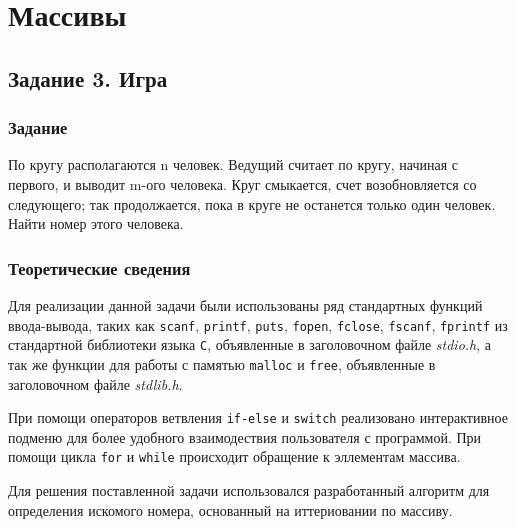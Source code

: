 \documentclass[12pt,a4paper]{report}
\begin{document}
\newpage



\chapter{Массивы}
\section{Задание 3. Игра}
\subsection{Задание}

\hspace{\parindent}По кругу располагаются n человек. Ведущий считает по кругу, начиная с первого, и выводит m-ого человека. Круг смыкается, счет возобновляется со следующего; так  продолжается, пока в круге не останется только один человек. Найти номер этого человека.

\subsection{Теоретические сведения}
\hspace{\parindent}Для реализации данной задачи были использованы ряд стандартных функций ввода-вывода, таких как \texttt{scanf}, \texttt{printf}, \texttt{puts}, \texttt{fopen}, \texttt{fclose}, \texttt{fscanf}, \texttt{fprintf} из стандартной библиотеки языка \verb+С+, объявленные в заголовочном файле \textit{stdio.h}, а так же функции для работы с памятью \verb+malloc+ и \verb+free+, объявленные в заголовочном файле \textit{stdlib.h}.

При помощи операторов ветвления \texttt{if-else} и \texttt{switch} реализовано интерактивное подменю для более удобного взаимодествия пользователя с программой. При помощи цикла \verb+for+ и \verb+while+ происходит обращение к эллементам массива.

Для решения поставленной задачи использовался разработанный алгоритм для определения искомого номера, основанный на иттериовании по массиву.
\end{document}
